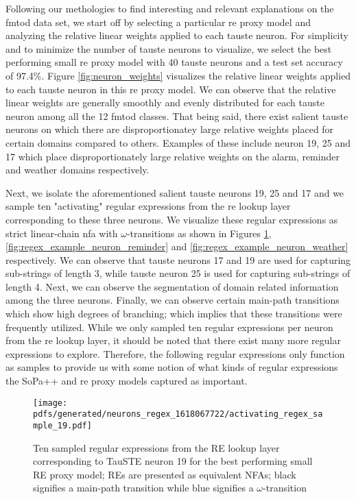 Following our methologies to find interesting and relevant explanations on the
\ac{fmtod} data set, we start off by selecting a particular \ac{re} proxy model and
analyzing the relative linear weights applied to each \ac{tauste} neuron. For
simplicity and to minimize the number of \ac{tauste} neurons to visualize, we select
the best performing small \ac{re} proxy model with 40 \ac{tauste} neurons and a test set
accuracy of 97.4$\%$. Figure \ref{fig:neuron_weights} visualizes the relative
linear weights applied to each \ac{tauste} neuron in this \ac{re} proxy model. We can
observe that the relative linear weights are generally smoothly and evenly
distributed for each \ac{tauste} neuron among all the 12 \ac{fmtod} classes. That being
said, there exist salient \ac{tauste} neurons on which there are disproportionatey
large relative weights placed for certain domains compared to others. Examples
of these include neuron 19, 25 and 17 which place disproportionately large
relative weights on the alarm, reminder and weather domains respectively.

Next, we isolate the aforementioned salient \ac{tauste} neurons 19, 25 and 17 and we
sample ten "activating" regular expressions from the \ac{re} lookup layer
corresponding to these three neurons. We visualize these regular expressions as
strict linear-chain \ac{nfa} with $\omega$-transitions as shown in Figures
\ref{fig:regex_example_neuron_alarm}, \ref{fig:regex_example_neuron_reminder}
and \ref{fig:regex_example_neuron_weather} respectively. We can observe that
\ac{tauste} neurons 17 and 19 are used for capturing sub-strings of length 3, while
\ac{tauste} neuron 25 is used for capturing sub-strings of length 4. Next, we can
observe the segmentation of domain related information among the three neurons.
Finally, we can observe certain main-path transitions which show high degrees of
branching; which implies that these transitions were frequently utilized. While
we only sampled ten regular expressions per neuron from the \ac{re} lookup layer, it
should be noted that there exist many more regular expressions to explore.
Therefore, the following regular expressions only function as samples to provide
us with some notion of what kinds of regular expressions the SoPa++ and \ac{re} proxy
models captured as important.

\newpage

\begin{figure}[t!]
  \centering \texttt{[image: pdfs/generated/neurons\_regex\_1618067722/activating\_regex\_sample\_19.pdf]}
  \caption[Ten sampled regular expressions from the RE lookup layer
  corresponding to TauSTE neuron 19 for the best performing small RE proxy
  model]{Ten sampled regular expressions from the RE lookup layer
    corresponding to TauSTE neuron 19 for the best performing small RE proxy
    model; REs are presented as equivalent NFAs; black signifies a
    main-path transition while blue signifies a $\omega$-transition}
  \label{fig:regex_example_neuron_alarm}
\end{figure}

